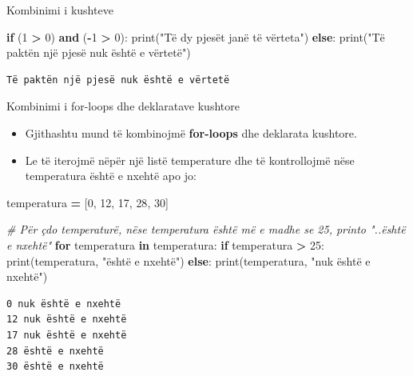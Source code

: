 \documentclass[
  ignorenonframetext,
]{beamer}
\newenvironment{Shaded}{\begin{snugshade}}{\end{snugshade}}
\newcommand{\BuiltInTok}[1]{#1}
\newcommand{\CommentTok}[1]{\textcolor[rgb]{0.56,0.35,0.01}{\textit{#1}}}
\newcommand{\ControlFlowTok}[1]{\textcolor[rgb]{0.13,0.29,0.53}{\textbf{#1}}}
\newcommand{\DecValTok}[1]{\textcolor[rgb]{0.00,0.00,0.81}{#1}}
\newcommand{\KeywordTok}[1]{\textcolor[rgb]{0.13,0.29,0.53}{\textbf{#1}}}
\newcommand{\NormalTok}[1]{#1}
\newcommand{\OperatorTok}[1]{\textcolor[rgb]{0.81,0.36,0.00}{\textbf{#1}}}
\newcommand{\StringTok}[1]{\textcolor[rgb]{0.31,0.60,0.02}{#1}}
\begin{document}
\begin{frame}[fragile]{Kombinimi i kushteve}
\protect\hypertarget{kombinimi-i-kushteve-1}{}
\begin{Shaded}
\begin{Highlighting}[]
\ControlFlowTok{if}\NormalTok{ (}\DecValTok{1} \OperatorTok{\textgreater{}} \DecValTok{0}\NormalTok{) }\KeywordTok{and}\NormalTok{ (}\OperatorTok{{-}}\DecValTok{1} \OperatorTok{\textgreater{}} \DecValTok{0}\NormalTok{):}
    \BuiltInTok{print}\NormalTok{(}\StringTok{"Të dy pjesët janë të vërteta"}\NormalTok{)}
\ControlFlowTok{else}\NormalTok{:}
    \BuiltInTok{print}\NormalTok{(}\StringTok{"Të paktën një pjesë nuk është e vërtetë"}\NormalTok{)}
\end{Highlighting}
\end{Shaded}

\begin{verbatim}
Të paktën një pjesë nuk është e vërtetë
\end{verbatim}
\end{frame}

\begin{frame}[fragile]{Kombinimi i for-loops dhe deklaratave kushtore}
\protect\hypertarget{kombinimi-i-for-loops-dhe-deklaratave-kushtore}{}
\begin{itemize}
\item
  Gjithashtu mund të kombinojmë \textbf{for-loops} dhe deklarata
  kushtore.
\item
  Le të iterojmë nëpër një listë temperature dhe të kontrollojmë nëse
  temperatura është e nxehtë apo jo:
\end{itemize}

\begin{Shaded}
\begin{Highlighting}[]
\NormalTok{temperatura }\OperatorTok{=}\NormalTok{ [}\DecValTok{0}\NormalTok{, }\DecValTok{12}\NormalTok{, }\DecValTok{17}\NormalTok{, }\DecValTok{28}\NormalTok{, }\DecValTok{30}\NormalTok{]}

\CommentTok{\# Për çdo temperaturë, nëse temperatura është më e madhe se 25, printo "..është e nxehtë"}
\ControlFlowTok{for}\NormalTok{ temperatura }\KeywordTok{in}\NormalTok{ temperatura:}
    \ControlFlowTok{if}\NormalTok{ temperatura }\OperatorTok{\textgreater{}} \DecValTok{25}\NormalTok{:}
        \BuiltInTok{print}\NormalTok{(temperatura, }\StringTok{"është e nxehtë"}\NormalTok{)}
    \ControlFlowTok{else}\NormalTok{:}
        \BuiltInTok{print}\NormalTok{(temperatura, }\StringTok{"nuk është e nxehtë"}\NormalTok{)}
\end{Highlighting}
\end{Shaded}

\begin{verbatim}
0 nuk është e nxehtë
12 nuk është e nxehtë
17 nuk është e nxehtë
28 është e nxehtë
30 është e nxehtë
\end{verbatim}
\end{frame}
\end{document}
